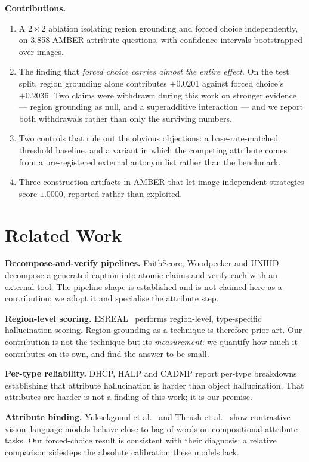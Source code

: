 \documentclass[conference]{IEEEtran}
\begin{document}
\textbf{Contributions.}
\begin{enumerate}
\item A $2\times2$ ablation isolating region grounding and forced choice
      independently, on 3{,}858 AMBER attribute questions, with confidence
      intervals bootstrapped over images.
\item The finding that \emph{forced choice carries almost the entire effect}.
      On the test split, region grounding alone contributes $+0.0201$ against
      forced choice's $+0.2036$. Two claims were withdrawn during this work on
      stronger evidence --- region grounding as null, and a superadditive
      interaction --- and we report both withdrawals rather than only the
      surviving numbers.
\item Two controls that rule out the obvious objections: a base-rate-matched
      threshold baseline, and a variant in which the competing attribute comes
      from a pre-registered external antonym list rather than the benchmark.
\item Three construction artifacts in AMBER that let image-independent
      strategies score $1.0000$, reported rather than exploited.
\end{enumerate}

\section{Related Work}

\textbf{Decompose-and-verify pipelines.} FaithScore, Woodpecker and
UNIHD~\cite{chen2024} decompose a generated caption into atomic claims and verify
each with an external tool. The pipeline shape is established and is not claimed
here as a contribution; we adopt it and specialise the attribute step.

\textbf{Region-level scoring.} ESREAL~\cite{esreal2024} performs region-level,
type-specific hallucination scoring. Region grounding as a technique is therefore
prior art. Our contribution is not the technique but its \emph{measurement}: we
quantify how much it contributes on its own, and find the answer to be small.

\textbf{Per-type reliability.} DHCP, HALP and CADMP report per-type breakdowns
establishing that attribute hallucination is harder than object hallucination.
That attributes are harder is not a finding of this work; it is our premise.

\textbf{Attribute binding.} Yuksekgonul et al.~\cite{yuksekgonul2023} and Thrush
et al.~\cite{thrush2022} show contrastive vision--language models behave close to
bag-of-words on compositional attribute tasks. Our forced-choice result is
consistent with their diagnosis: a relative comparison sidesteps the absolute
calibration these models lack.
\end{document}
